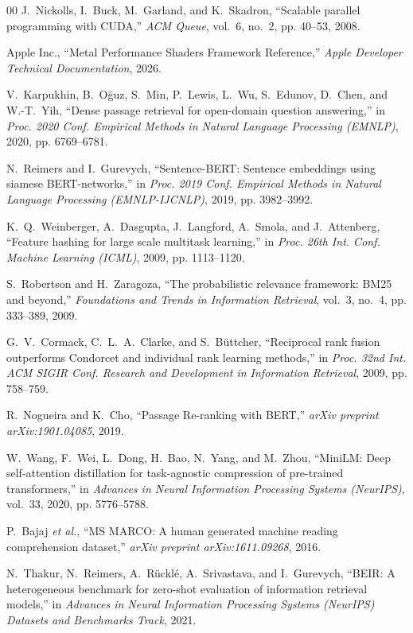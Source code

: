 \documentclass[conference]{IEEEtran}
\begin{document}
\begin{thebibliography}{00}
J.~Nickolls, I.~Buck, M.~Garland, and K.~Skadron, ``Scalable parallel programming with CUDA,'' \emph{ACM Queue}, vol.~6, no.~2, pp. 40--53, 2008.

Apple Inc., ``Metal Performance Shaders Framework Reference,'' \emph{Apple Developer Technical Documentation}, 2026.

V.~Karpukhin, B.~O{\u{g}}uz, S.~Min, P.~Lewis, L.~Wu, S.~Edunov, D.~Chen, and W.-T.~Yih, ``Dense passage retrieval for open-domain question answering,'' in \emph{Proc. 2020 Conf. Empirical Methods in Natural Language Processing (EMNLP)}, 2020, pp. 6769--6781.

N.~Reimers and I.~Gurevych, ``Sentence-BERT: Sentence embeddings using siamese BERT-networks,'' in \emph{Proc. 2019 Conf. Empirical Methods in Natural Language Processing (EMNLP-IJCNLP)}, 2019, pp. 3982--3992.

K.~Q.~Weinberger, A.~Dasgupta, J.~Langford, A.~Smola, and J.~Attenberg, ``Feature hashing for large scale multitask learning,'' in \emph{Proc. 26th Int. Conf. Machine Learning (ICML)}, 2009, pp. 1113--1120.

S.~Robertson and H.~Zaragoza, ``The probabilistic relevance framework: BM25 and beyond,'' \emph{Foundations and Trends in Information Retrieval}, vol.~3, no.~4, pp. 333--389, 2009.

G.~V.~Cormack, C.~L.~A.~Clarke, and S.~B{\"u}ttcher, ``Reciprocal rank fusion outperforms Condorcet and individual rank learning methods,'' in \emph{Proc. 32nd Int. ACM SIGIR Conf. Research and Development in Information Retrieval}, 2009, pp. 758--759.

R.~Nogueira and K.~Cho, ``Passage Re-ranking with BERT,'' \emph{arXiv preprint arXiv:1901.04085}, 2019.

W.~Wang, F.~Wei, L.~Dong, H.~Bao, N.~Yang, and M.~Zhou, ``MiniLM: Deep self-attention distillation for task-agnostic compression of pre-trained transformers,'' in \emph{Advances in Neural Information Processing Systems (NeurIPS)}, vol.~33, 2020, pp. 5776--5788.

P.~Bajaj \emph{et al.}, ``MS MARCO: A human generated machine reading comprehension dataset,'' \emph{arXiv preprint arXiv:1611.09268}, 2016.

N.~Thakur, N.~Reimers, A.~R{\"u}ckl{\'e}, A.~Srivastava, and I.~Gurevych, ``BEIR: A heterogeneous benchmark for zero-shot evaluation of information retrieval models,'' in \emph{Advances in Neural Information Processing Systems (NeurIPS) Datasets and Benchmarks Track}, 2021.

\end{thebibliography}
\end{document}
